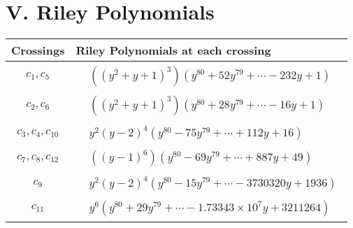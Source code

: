 \documentclass[1p]{elsarticle_modified}
\theoremstyle{definition}
\begin{document}
\centering \section*{ V. Riley Polynomials}
\begin{tabular}{m{50pt}|m{274pt}}
Crossings & \hspace{64pt}Riley Polynomials at each crossing \\
\hline $$\begin{aligned}c_{1},c_{5}\end{aligned}$$&$\begin{aligned}
&((y^2+y+1)^3)(y^{80}+52 y^{79}+\cdots-232 y+1)
\end{aligned}$\\
\hline $$\begin{aligned}c_{2},c_{6}\end{aligned}$$&$\begin{aligned}
&((y^2+y+1)^3)(y^{80}+28 y^{79}+\cdots-16 y+1)
\end{aligned}$\\
\hline $$\begin{aligned}c_{3},c_{4},c_{10}\end{aligned}$$&$\begin{aligned}
&y^2(y-2)^4(y^{80}-75 y^{79}+\cdots+112 y+16)
\end{aligned}$\\
\hline $$\begin{aligned}c_{7},c_{8},c_{12}\end{aligned}$$&$\begin{aligned}
&((y-1)^6)(y^{80}-69 y^{79}+\cdots+887 y+49)
\end{aligned}$\\
\hline $$\begin{aligned}c_{9}\end{aligned}$$&$\begin{aligned}
&y^2(y-2)^4(y^{80}-15 y^{79}+\cdots-3730320 y+1936)
\end{aligned}$\\
\hline $$\begin{aligned}c_{11}\end{aligned}$$&$\begin{aligned}
&y^6(y^{80}+29 y^{79}+\cdots-1.73343\times10^{7} y+3211264)
\end{aligned}$\\
\hline
\end{tabular}
\vskip 2pc
\end{document}
